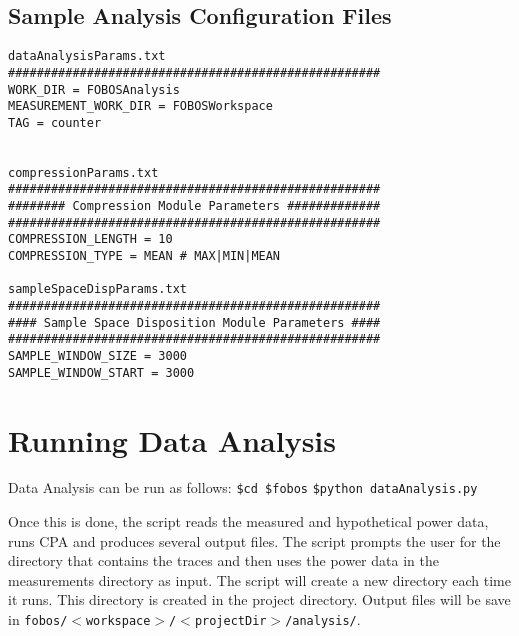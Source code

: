\subsection{Sample Analysis Configuration Files}

\begin{verbatim}
dataAnalysisParams.txt 
####################################################
WORK_DIR = FOBOSAnalysis 
MEASUREMENT_WORK_DIR = FOBOSWorkspace 
TAG = counter


compressionParams.txt 
#################################################### 
######## Compression Module Parameters ############# 
#################################################### 
COMPRESSION_LENGTH = 10 
COMPRESSION_TYPE = MEAN # MAX|MIN|MEAN 

sampleSpaceDispParams.txt 
#################################################### 
#### Sample Space Disposition Module Parameters #### 
#################################################### 
SAMPLE_WINDOW_SIZE = 3000 
SAMPLE_WINDOW_START = 3000

\end{verbatim}


\section{Running Data Analysis}

Data Analysis can be run as follows: \newline
\texttt{\$cd \$fobos} \newline
\texttt{\$python dataAnalysis.py} \newline

Once this is done, the script reads the measured and hypothetical power data, runs CPA and
produces several output files. The script prompts the user for the directory that contains the traces
and then uses the power data in the measurements directory as input.  The script
will create a new directory each time it runs. This directory is created in the project directory. Output files will be save in \texttt{fobos/$<$workspace$>$/$<$projectDir$>$/analysis/}.

